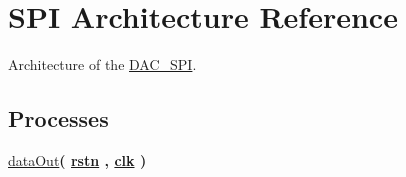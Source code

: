 \hypertarget{classDAC__SPI_1_1SPI}{\section{S\-P\-I Architecture Reference}
\label{classDAC__SPI_1_1SPI}
}


Architecture of the \hyperlink{classDAC__SPI}{D\-A\-C\-\_\-\-S\-P\-I}.  


\subsection*{Processes}
 \begin{DoxyCompactItemize}
\item 
\hypertarget{classDAC__SPI_1_1SPI_a242d986315a0356a0eab33f27aaf9ee0}{\hyperlink{classDAC__SPI_1_1SPI_a242d986315a0356a0eab33f27aaf9ee0}{data\-Out}{\bfseries  ( {\bfseries {\bfseries \hyperlink{classDAC__SPI_aba021aec4b477b89079bb58ccadcc67e}{rstn}} \textcolor{vhdlchar}{ }\textcolor{vhdlchar}{ }\textcolor{vhdlchar}{ }} , {\bfseries {\bfseries \hyperlink{classDAC__SPI_a8120037e0ee47c35ba2d79242209c72e}{clk}} \textcolor{vhdlchar}{ }} )}}\label{classDAC__SPI_1_1SPI_a242d986315a0356a0eab33f27aaf9ee0}

\end{DoxyCompactItemize}
